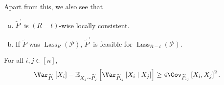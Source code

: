 Apart from this, we also see that
\begin{enumerate}[(a)]
	\item \(\widetilde{P} ^\prime \) is \((R-t)\)-wise locally consistent.
	\item If \(\widetilde{P} \) was \(\mathop{\mathrm{Lass}}_R(\mathcal{P})\), \(\widetilde{P} ^\prime \) is feasible for \(\mathop{\mathrm{Lass}}_{R-t} (\mathcal{P})\).
\end{enumerate}

\begin{lemma}\label{lma:conditioning-reduces-variance}
	For all \(i, j\in [n]\),
	\[
		\Var_{\widetilde{P} _i}\left[X_i \right] - \mathbb{E}_{X_j\sim \widetilde{P} _j}\left[\Var_{\widetilde{P} _{ij}}\left[X_i \mid X_j \right]  \right] \geq 4\Cov_{\widetilde{P} _{ij}}\left[ X_i, X_j\right] ^{2} .
	\]
\end{lemma}
